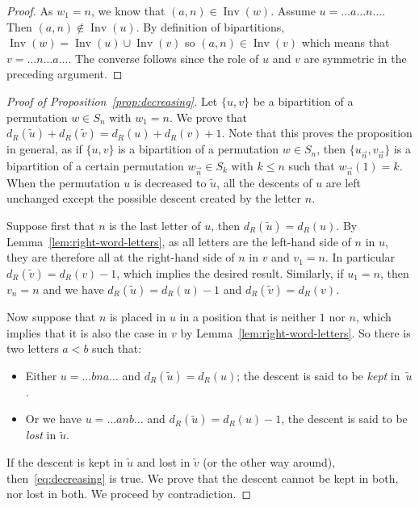 \documentclass[Unicode]{cedram-alco}
\theoremstyle{definition}
\DeclareMathOperator{\invs}{Inv}
\newcommand{\dec}[1]{\widetilde{#1}}
\newcommand{\R}{{\overrightarrow{n}}}
\newcommand{\dd}{d_R}
\begin{document}
\begin{proof}
As $w_1 = n$, we know that $(a,n) \in \invs(w)$. Assume $u=\dots a \dots n\dots$. Then $(a,n) \not\in \invs(u)$. By definition of bipartitions, $\invs(w) = \invs(u) \cup \invs(v)$ so $(a,n) \in \invs(v)$ which means that $v=\dots n\dots a\dots$. The converse follows since the role of $u$ and $v$ are symmetric in the preceding argument. 
\end{proof}

\begin{proof}[Proof of Proposition~\ref{prop:decreasing}]
Let $\lbrace u, v \rbrace$ be a bipartition of a permutation $w \in S_n$ with $w_1 = n$. We prove that $\dd(\dec{u}) + \dd(\dec{v}) = \dd(u) + \dd(v) +1$. Note that this proves the proposition in general, as if $\lbrace u, v \rbrace$ is a bipartition of a permutation $w \in S_n$, then $\lbrace u_\R, v_\R \rbrace$ is a bipartition of a certain permutation $w_\R \in S_k$ with $k \leq n$ such that ${w_\R}(1) = k$. When the permutation $u$ is decreased to $\dec{u}$, all the descents of $u$ are left unchanged except the possible descent created by the letter $n$. 

Suppose first that $n$ is the last letter of $u$, then $\dd(\dec{u}) = \dd(u)$. By Lemma~\ref{lem:right-word-letters}, as all letters are the left-hand side of $n$ in $u$, they are therefore all at the right-hand side of $n$ in $v$ and $v_1 = n$. In particular $\dd(\dec{v}) = \dd(v) -1$, which implies the desired result. Similarly, if $u_1 =n$, then $v_n = n$ and we have $\dd(\dec{u}) = \dd(u) - 1$ and $\dd(\dec{v}) = \dd(v)$.

Now suppose that $n$ is placed in $u$ in a position that is neither $1$ nor $n$, which implies that it is also the case in $v$ by Lemma~\ref{lem:right-word-letters}. So  there is two letters $a<b$ such that:
\begin{itemize}
\item Either $u = \dots bna \dots$ and $\dd(\dec{u}) = \dd(u)$; the descent is said to be {\em kept} in~$\dec{u}$. 
\item Or we have $u = \dots anb \dots$ and $\dd(\dec{u}) = \dd(u) - 1$, the descent is said to be {\em lost} in $\dec{u}$. 
\end{itemize}
If the descent is kept in $\dec{u}$ and lost in $\dec{v}$ (or the other way around), then~\eqref{eq:decreasing} is true. We prove that the descent cannot be kept in both, nor lost in both. We proceed by contradiction.


\end{proof}
\end{document}
